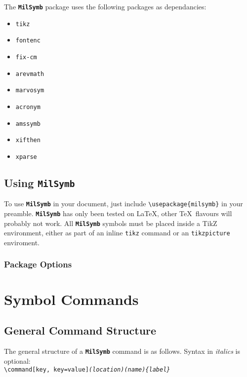 \documentclass[a4paper, titlepage]{article}
\newcommand\MilSymb{\textbf{\texttt{MilSymb}} }
\begin{document}
The \MilSymb package uses the following packages as dependancies:

\begin{itemize}
\item \texttt{tikz}
\item \texttt{fontenc}
\item \texttt{fix-cm}
\item \texttt{arevmath}
\item \texttt{marvosym}
\item \texttt{acronym}
\item \texttt{amssymb}
\item \texttt{xifthen}
\item \texttt{xparse}
\end{itemize}

\subsection{Using \MilSymb}

To use \MilSymb in your document, just include \texttt{\textbackslash usepackage\{milsymb\}} in your preamble. \MilSymb has only been tested on \LaTeX, other \TeX\  flavours will probably not work. All \MilSymb symbols must be placed inside a TikZ environment, either as part of an inline \texttt{tikz} command or an \texttt{tikzpicture} enviroment. 

\subsubsection{Package Options}

\section{Symbol Commands}

\subsection{General Command Structure}

The general structure of a \MilSymb command is as follows. Syntax in \textit{italics} is optional:\\

\texttt{\textbackslash command[key, key=value]\textit{(location)(name)\{label\}}}
\end{document}
